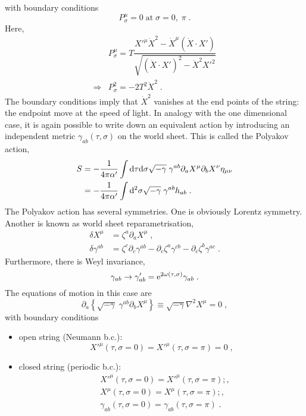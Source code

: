 \documentclass[11pt]{article} %
\begin{document}
with boundary conditions
\begin{equation}
	P^{\mu}_{\sigma} = 0\;\mathrm{ at }\;\sigma=0,\;\pi\;.
\end{equation}
Here,
\begin{align}
	&P^{\mu}_{\sigma} = T\dfrac{X'^{\mu}\dot{X}^2 - \dot{X}^{\mu}\left( \dot{X}\cdot X' \right)}{\sqrt{\left( \dot{X}\cdot X' \right)^2 - \dot{X}^2X'^2}}\\
	\Rightarrow & P_{\sigma}^2 = -2T^2\dot{X}^2\;.
\end{align}
The boundary conditions imply that $\dot{X}^2$ vanishes at the end points of the string: the endpoint move at the speed of light.\newline
In analogy with the one dimensional case, it is again possible to write down an equivalent action by introducing an independent metric $\gamma_{ab}(\tau,\sigma)$ on the world sheet. This is called the Polyakov action,
\begin{align}
	S &= -\dfrac{1}{4\pi\alpha'} \int\mathrm{d}\tau\mathrm{d}\sigma \sqrt{-\gamma}\;\gamma^{ab}\partial_aX^{\mu}\partial_bX^{\nu}\eta_{\mu\nu}\\
	   &=  -\dfrac{1}{4\pi\alpha'} \int\mathrm{d}^2\sigma \sqrt{-\gamma}\;\gamma^{ab}h_{ab}\;.
\end{align}
The Polyakov action has several symmetries. One is obviously Lorentz symmetry. Another is known as world sheet reparametrisation,
\begin{align}
	\delta X^{\mu} &= \zeta^a\partial_aX^{\mu}\;,\\
	\delta\gamma^{ab} &= \zeta^c\partial_c\gamma^{ab} - \partial_c\zeta^a\gamma^{cb} - \partial_c\zeta^b\gamma^{ac}\;.
\end{align} 
Furthermore, there is Weyl invariance,
\begin{equation}
	\gamma_{ab} \rightarrow \gamma_{ab}' = \mathrm{e}^{2\omega(\tau,\sigma)}\gamma_{ab}\;.
\end{equation}
The equations of motion in this case are
\begin{equation}
	\partial_a\left\{ \sqrt{-\gamma}\;\gamma^{ab}\partial_bX^{\mu}\right\} \equiv \sqrt{-\gamma}\nabla^2X^{\mu} = 0\;,
\end{equation}
with boundary conditions
\begin{itemize}
	\item open string  (Neumann b.c.): 
		\begin{equation}
			X'^{\mu}(\tau,\sigma = 0) = X'^{\mu}(\tau,\sigma = \pi) = 0\;,
		\label{neumannbc}
		\end{equation}
	\item closed string (periodic b.c.): 
		\begin{align}
			&X'^{\mu}(\tau,\sigma = 0) = X'^{\mu}(\tau,\sigma = \pi);,\nonumber\\
			&X^{\mu}(\tau,\sigma = 0) = X^{\mu}(\tau,\sigma = \pi);,\nonumber\\
			&\gamma_{ab}(\tau,\sigma = 0) = \gamma_{ab}(\tau,\sigma = \pi)\;.\label{periodicbc}
		\end{align}
\end{itemize}
\end{document}
